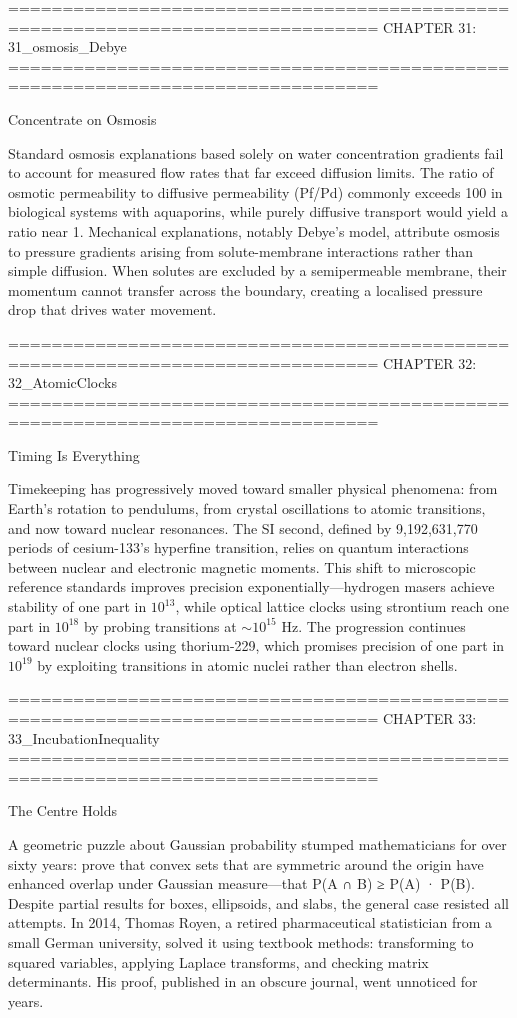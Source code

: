 ================================================================================
CHAPTER 31: 31_osmosis_Debye
================================================================================

Concentrate on Osmosis

Standard osmosis explanations based solely on water concentration gradients fail to account for measured flow rates that far exceed diffusion limits. The ratio of osmotic permeability to diffusive permeability (Pf/Pd) commonly exceeds 100 in biological systems with aquaporins, while purely diffusive transport would yield a ratio near 1. Mechanical explanations, notably Debye's model, attribute osmosis to pressure gradients arising from solute-membrane interactions rather than simple diffusion. When solutes are excluded by a semipermeable membrane, their momentum cannot transfer across the boundary, creating a localised pressure drop that drives water movement.


================================================================================
CHAPTER 32: 32_AtomicClocks
================================================================================

Timing Is Everything

Timekeeping has progressively moved toward smaller physical phenomena: from Earth's rotation to pendulums, from crystal oscillations to atomic transitions, and now toward nuclear resonances. The SI second, defined by 9,192,631,770 periods of cesium-133's hyperfine transition, relies on quantum interactions between nuclear and electronic magnetic moments. This shift to microscopic reference standards improves precision exponentially—hydrogen masers achieve stability of one part in $10^{13}$, while optical lattice clocks using strontium reach one part in $10^{18}$ by probing transitions at ${\sim}10^{15}$ Hz. The progression continues toward nuclear clocks using thorium-229, which promises precision of one part in $10^{19}$ by exploiting transitions in atomic nuclei rather than electron shells.


================================================================================
CHAPTER 33: 33_IncubationInequality
================================================================================

The Centre Holds

A geometric puzzle about Gaussian probability stumped mathematicians for over sixty years: prove that convex sets that are symmetric around the origin have enhanced overlap under Gaussian measure—that P(A ∩ B) ≥ P(A) · P(B). Despite partial results for boxes, ellipsoids, and slabs, the general case resisted all attempts. In 2014, Thomas Royen, a retired pharmaceutical statistician from a small German university, solved it using textbook methods: transforming to squared variables, applying Laplace transforms, and checking matrix determinants. His proof, published in an obscure journal, went unnoticed for years.


